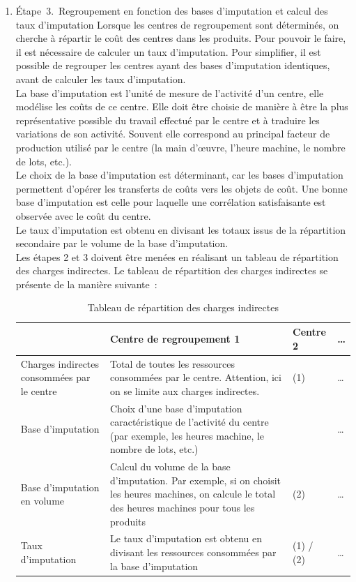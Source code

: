 \documentclass{tufte-handout}
\begin{document}
\begin{enumerate}
\begin{enumerate}
\item Étape 3. Regroupement en fonction des bases d’imputation et calcul des taux d’imputation
\label{sec:org169e55b}
Lorsque les centres de regroupement sont déterminés, on cherche à répartir le coût des centres dans les produits. Pour pouvoir le faire, il est nécessaire de calculer un taux d'imputation. Pour simplifier, il est possible de regrouper les centres ayant des bases d'imputation identiques, avant de calculer les taux d'imputation.\\
La base d'imputation est l'unité de mesure de l'activité d'un centre, elle modélise les coûts de ce centre. Elle doit être choisie de manière à être la plus représentative possible du travail effectué par le centre et à traduire les variations de son activité. Souvent elle correspond au principal facteur de production utilisé par le centre (la main d'œuvre, l'heure machine, le nombre de lots, etc.).\\
Le choix de la base d'imputation est déterminant, car les bases d'imputation permettent d'opérer les transferts de coûts vers les objets de coût. Une bonne base d'imputation est celle pour laquelle une corrélation satisfaisante est observée avec le coût du centre.\\
Le taux d'imputation est obtenu en divisant les totaux issus de la répartition secondaire par le volume de la base d'imputation.\\
Les étapes 2 et 3 doivent être menées en réalisant un tableau de répartition des charges indirectes. Le tableau de répartition des charges indirectes se présente de la manière suivante :\\
\begin{table}[htbp]
\caption{Tableau de répartition des charges indirectes}
\centering
\begin{tabular}{llll}
 & Centre de regroupement 1 & Centre 2 & \ldots{}\\
\hline
Charges indirectes consommées par le centre & Total de toutes les ressources consommées par le centre. Attention, ici on se limite aux charges indirectes. & (1) & \ldots{}\\
Base d'imputation & Choix d'une base d'imputation caractéristique de l'activité du centre (par exemple, les heures machine, le nombre de lots, etc.) &  & \ldots{}\\
Base d'imputation en volume & Calcul du volume de la base d'imputation. Par exemple, si on choisit les heures machines, on calcule le total des heures machines pour tous les produits & (2) & \ldots{}\\
Taux d'imputation & Le taux d'imputation est obtenu en divisant les ressources consommées par la base d'imputation & (1) / (2) & \ldots{}\\
\end{tabular}
\end{table}


\end{enumerate}
\end{enumerate}
\end{document}
